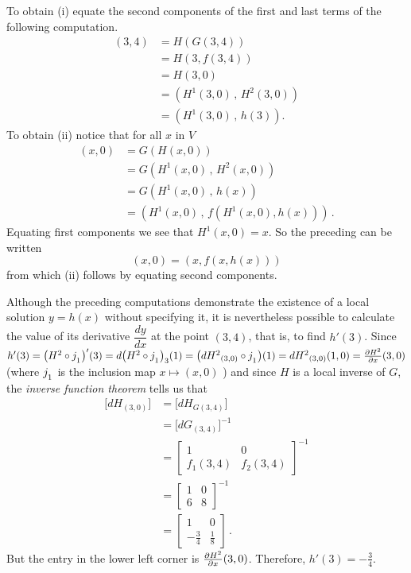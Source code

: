 To obtain (i) equate the second components of the first and last terms of the following
computation.
  \begin{align*}
     (3,4) &= H(G(3,4)) \\
           &= H(3, f(3,4)) \\
           &= H(3,0) \\
           &= (H^1(3,0)\,,\,H^2(3,0)) \\
           &= (H^1(3,0)\,,\,h(3)) .
  \end{align*}
To obtain (ii) notice that for all $x$ in $V$
  \begin{align*}
    (x,0) &= G(H(x,0)) \\
          &= G(H^1(x,0)\,,\,H^2(x,0)) \\
          &= G(H^1(x,0)\,,\,h(x)) \\
          &= (H^1(x,0)\,,\,f(H^1(x,0),h(x)))\,.
  \end{align*}
Equating first components we see that $H^1(x,0) = x$. So the
preceding can be written
  \[ (x,0) = (x,f(x,h(x))) \]
from which (ii) follows by equating second components.

Although the preceding computations demonstrate the existence of a local solution $y = h(x)$
without specifying it, it is nevertheless possible to calculate the value of its derivative
$\dfrac{dy}{dx}$ at the point $(3,4)$, that is, to find $h'(3)$. Since $h'(3) = \bigl(H^2
\circ j_{{}_{{\scriptstyle{1}}}}\bigr)'(3) = d\bigl(H^2 \circ j_{{}_{{\scriptstyle{1}}}}\bigr)_3(1) =
\bigl(dH^2{}_{(3,0)} \circ j_{{}_{{\scriptstyle{1}}}}\bigr)(1) = dH^2{}_{(3,0)}(1,0) = \frac{\partial H^2}{\partial x}(3,0)$
(where $j_{{}_{{\scriptstyle{1}}}}$ is the inclusion map $x \mapsto (x,0)$ ) and since $H$ is a local
inverse of $G$, the \emph{inverse function theorem} tells us that
  \begin{align*}
     \bigl[dH_{(3,0)}\bigr] &= \bigl[dH_{G(3,4)}\bigr] \\
                            &= \bigl[dG_{(3,4)}\bigr]^{-1} \\
                            &= {\begin{bmatrix}
                                   1         &      0   \\
                                   f_1(3,4)  &  f_2(3,4)
                                 \end{bmatrix}}^{-1} \\
                            &= {\begin{bmatrix}
                                   1  &  0 \\
                                   6  &  8
                                \end{bmatrix}}^{-1} \\
                            &= \begin{bmatrix}
                                   1         &     0 \\
                                   -\frac34  &  \frac18
                               \end{bmatrix} \,.
  \end{align*}
But the entry in the lower left corner is $\frac{\partial H^2}{\partial x}(3,0)$.  Therefore, $h'(3) = - \frac34$.

